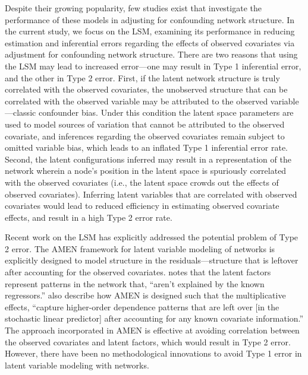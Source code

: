 \documentclass[11pt]{article}
\begin{document}
Despite their growing popularity, few studies exist that investigate
the performance of these models in adjusting for confounding network
structure. In the current study, we focus on the LSM, examining its
performance in reducing estimation and inferential errors regarding
the effects of observed covariates via adjustment for confounding
network structure. There are two reasons that using the LSM may lead
to increased error---one may result in Type 1 inferential error, and
the other in Type 2 error. First, if the latent
network structure is truly correlated with the observed covariates,
the unobserved structure that can be correlated with the observed
variable may be attributed to the observed variable---classic confounder bias. Under this
condition the latent space parameters are used to model sources of
variation that cannot be attributed to the observed covariate, and
inferences regarding the observed covariates remain subject to omitted
variable bias, which leads to an inflated Type 1 inferential error
rate. Second, the latent configurations inferred may result in a
representation of the network wherein a node's position in the latent
space is spuriously correlated with the observed covariates (i.e., the latent space crowds out the effects of observed covariates). Inferring
latent variables that are correlated with observed covariates would
lead to reduced efficiency in estimating observed covariate effects,
and result in a high Type 2 error rate.


Recent work on the LSM has explicitly addressed the potential problem
of Type 2 error. The AMEN framework for latent variable modeling of
networks is explicitly designed to model structure in the
residuals---structure that is leftover after accounting for the
observed covariates. \citet[p. 43]{hoff2015dyadic} notes that the
latent factors represent patterns in the network that, ``aren't
explained by the known regressors.''
\citet[pp. 12--13]{minhas2016inferential} also describe how AMEN is
designed such that the multiplicative effects, ``capture higher-order
dependence patterns that are left over [in the stochastic linear
  predictor] after accounting for any known covariate information.''
The approach incorporated in AMEN is effective at avoiding correlation
between the observed covariates and latent factors, which would result
in Type 2 error. However, there have been no methodological
innovations to avoid Type 1 error in latent variable modeling with
networks. 
\end{document}
